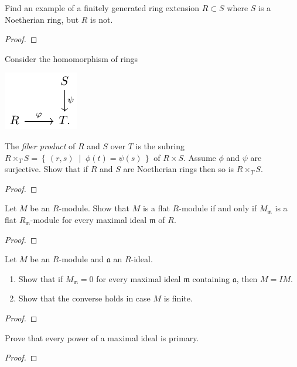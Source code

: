 \begin{problem}
Find an example of a finitely generated ring extension $R\subset
S$ where $S$ is a Noetherian ring, but $R$ is not.
\end{problem}
\begin{proof}
\end{proof}
\newpage
\begin{problem}
Consider the homomorphism of rings
\begin{center}
\includegraphics{figures/hw-4-ring-maps}
\end{center}
The \emph{fiber product} of $R$ and $S$ over $T$ is the subring
$R\times_T S=\left\{\,(r,s)\;\middle|\;\phi(t)=\psi(s)\,\right\}$
of $R\times S$. Assume $\phi$ and $\psi$ are surjective. Show
that if $R$ and $S$ are Noetherian rings then so is $R\times_T
S$.
\end{problem}
\begin{proof}
\end{proof}
\newpage
\begin{problem}
Let $M$ be an $R$-module. Show that $M$ is a flat $R$-module if
and only if $M_{\mathfrak{m}}$ is a flat
$R_{\mathfrak{m}}$-module for every maximal ideal $\mathfrak{m}$
of $R$.
\end{problem}
\begin{proof}
\end{proof}
\newpage
\begin{problem}
Let $M$ be an $R$-module and $\mathfrak{a}$ an $R$-ideal.
\begin{enumerate}[noitemsep,label=(\alph*)]
\item Show that if $M_{\mathfrak{m}}=0$ for every maximal ideal
  $\mathfrak{m}$ containing $\mathfrak{a}$, then $M=IM$.
\item Show that the converse holds in case $M$ is finite.
\end{enumerate}
\end{problem}
\begin{proof}
\end{proof}
\newpage
\begin{problem}
Prove that every power of a maximal ideal is primary.
\end{problem}
\begin{proof}
\end{proof}
